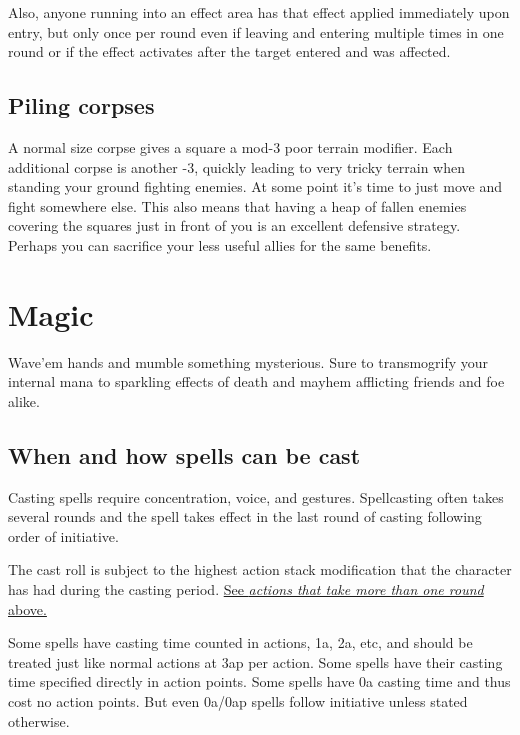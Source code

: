 Also, anyone running into an effect area has that effect applied immediately upon entry, but only once per round even if leaving and entering multiple times in one round or if the effect activates after the target entered and was affected.


\subsection*{Piling corpses}
A normal size corpse gives a square a mod-3 poor terrain modifier. Each additional corpse is another -3, quickly leading to very tricky terrain when standing your ground fighting enemies. At some point it's time to just move and fight somewhere else. This also means that having a heap of fallen enemies covering the squares just in front of you is an excellent defensive strategy. Perhaps you can sacrifice your less useful allies for the same benefits.













\section*{Magic}


Wave'em hands and mumble something mysterious. Sure to transmogrify your internal mana to sparkling effects of death and mayhem afflicting friends and foe alike.


\subsection*{When and how spells can be cast}
Casting spells require concentration, voice, and gestures. Spellcasting often takes several rounds and the spell takes effect in the last round of casting following order of initiative.

The cast roll is subject to the highest action stack modification that the character has had during the casting period. \hyperref[multiroundactions]{See \emph{actions that take more than one round} above.}

Some spells have casting time counted in actions, 1a, 2a, etc, and should be treated just like normal actions at 3ap per action. Some spells have their casting time specified directly in action points. Some spells have 0a casting time and thus cost no action points. But even 0a/0ap spells follow initiative unless stated otherwise.

